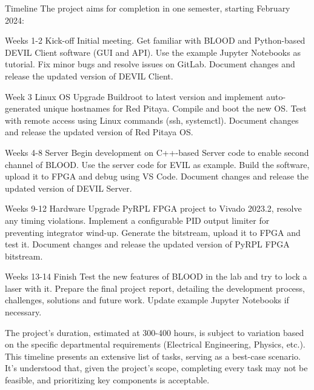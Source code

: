 \documentclass{project-proposal}
\begin{document}
\begin{sectiontimeline}{Timeline}
    The project aims for completion in one semester, starting February 2024:

    \timelineentry
    {Weeks 1-2}
    {Kick-off}
    {
        Initial meeting. Get familiar with BLOOD and Python-based DEVIL Client software
        (GUI and API). Use the example Jupyter Notebooks as tutorial. Fix minor bugs
        and resolve issues on GitLab. Document changes and release the updated version
        of DEVIL Client.
    }

    \timelineentryspacer

    \timelineentry
    {Week 3}
    {Linux OS}
    {
        Upgrade Buildroot to latest version and implement auto-generated unique
        hostnames for Red Pitaya. Compile and boot the new OS. Test with remote
        access using Linux commands (ssh, systemctl). Document changes and release the
        updated version of Red Pitaya OS.
    }

    \timelineentryspacer

    \timelineentry
    {Weeks 4-8}
    {Server}
    {
        Begin development on C++-based Server code to enable second channel of BLOOD.
        Use the server code for EVIL as example. Build the software, upload it to FPGA
        and debug using VS Code. Document changes and release the updated version of
        DEVIL Server.
    }

    \newpage

    \timelineentry
    {Weeks 9-12}
    {Hardware}
    {
        Upgrade PyRPL FPGA project to Vivado 2023.2, resolve any timing violations.
        Implement a configurable PID output limiter for preventing integrator wind-up.
        Generate the bitstream, upload it to FPGA and test it. Document changes and
        release the updated version of PyRPL FPGA bitstream.
    }

    \timelineentryspacer

    \timelineentry
    {Weeks 13-14}
    {Finish}
    {
        Test the new features of BLOOD in the lab and try to lock a laser with it.
        Prepare the final project report, detailing the development process, challenges,
        solutions and future work. Update example Jupyter Notebooks if necessary.
    }

    The project's duration, estimated at 300-400 hours, is subject to variation based
    on the specific departmental requirements (Electrical Engineering, Physics, etc.).
    This timeline presents an extensive list of tasks, serving as a best-case scenario.
    It's understood that, given the project's scope, completing every task may not be
    feasible, and prioritizing key components is acceptable.

\end{sectiontimeline}
\end{document}
